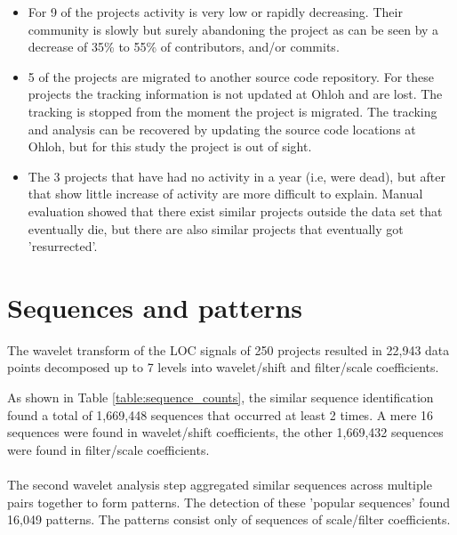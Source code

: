 \begin{itemize}
	\item For 9 of the projects activity is very low or rapidly decreasing. Their
		community is slowly but surely abandoning the project as can be seen by a
		decrease of 35\% to 55\% of contributors, and/or commits.

	\item 5 of the projects are migrated to another source code repository. For
		these projects the tracking information is not updated at Ohloh and are lost.
		The tracking is stopped from the moment the project is migrated. The tracking
		and analysis can be recovered by updating the source code locations at Ohloh,
		but for this study the project is out of sight.

	\item The 3 projects that have had no activity in a year (i.e, were dead), but
		after that show little increase of activity are more difficult to explain.
		Manual evaluation showed that there exist similar projects outside the data
		set that eventually die, but there are also similar projects that eventually
		got 'resurrected'.
\end{itemize}



\section{Sequences and patterns}
\label{section:seqs_patterns}
The wavelet transform of the LOC signals of 250 projects resulted in 22,943
data points decomposed up to 7 levels into wavelet/shift and filter/scale
coefficients.



\noindent
As shown in Table \ref{table:sequence_counts}, the similar sequence
identification found a total of 1,669,448 sequences that occurred at least 2
times. A mere 16 sequences were found in wavelet/shift coefficients, the other
1,669,432 sequences were found in filter/scale coefficients.

\paragraph{}
The second wavelet analysis step aggregated similar sequences across multiple
pairs together to form patterns. The detection of these 'popular sequences'
found 16,049 patterns. The patterns consist only of sequences of scale/filter
coefficients.

